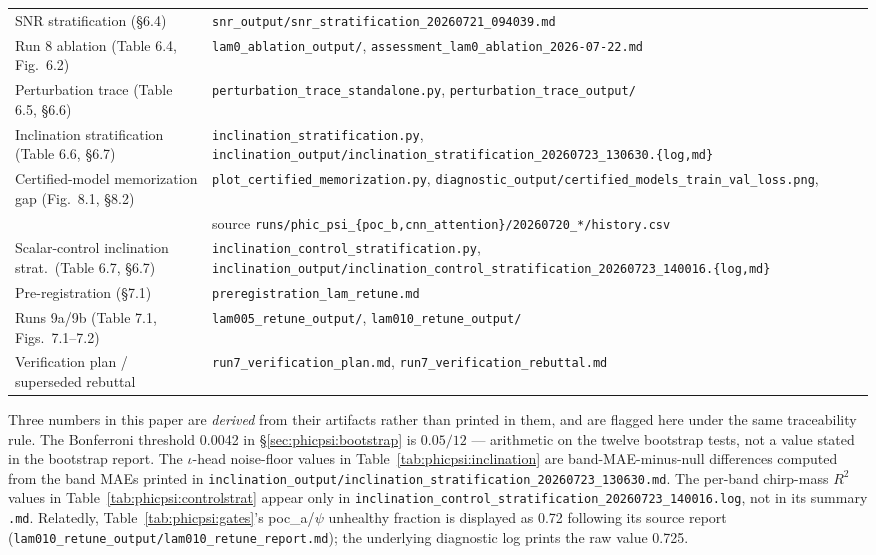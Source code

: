 \begin{table}[tbp]
{\begin{tabular}{@{}ll@{}}
        SNR stratification (\S6.4)                         & \texttt{snr\_output/snr\_stratification\_20260721\_094039.md} \\
        Run 8 ablation (Table 6.4, Fig.~6.2)               & \texttt{lam0\_ablation\_output/}, \texttt{assessment\_lam0\_ablation\_2026-07-22.md} \\
        Perturbation trace (Table 6.5, \S6.6)              & \texttt{perturbation\_trace\_standalone.py}, \texttt{perturbation\_trace\_output/} \\
        Inclination stratification (Table 6.6, \S6.7)      & \texttt{inclination\_stratification.py}, \texttt{inclination\_output/inclination\_stratification\_20260723\_130630.\{log,md\}} \\
        Certified-model memorization gap (Fig.~8.1, \S8.2) & \texttt{plot\_certified\_memorization.py}, \texttt{diagnostic\_output/certified\_models\_train\_val\_loss.png}, \\
                                                           & \quad source \texttt{runs/phic\_psi\_\{poc\_b,cnn\_attention\}/20260720\_*/history.csv} \\
        Scalar-control inclination strat.\ (Table 6.7, \S6.7) & \texttt{inclination\_control\_stratification.py}, \texttt{inclination\_output/inclination\_control\_stratification\_20260723\_140016.\{log,md\}} \\
        Pre-registration (\S7.1)                           & \texttt{preregistration\_lam\_retune.md} \\
        Runs 9a/9b (Table 7.1, Figs.~7.1--7.2)             & \texttt{lam005\_retune\_output/}, \texttt{lam010\_retune\_output/} \\
        Verification plan / superseded rebuttal            & \texttt{run7\_verification\_plan.md}, \texttt{run7\_verification\_rebuttal.md} \\
        \bottomrule
    \end{tabular}
    }
\end{table}

Three numbers in this paper are \emph{derived} from their artifacts rather than printed in them, and are flagged here under the same traceability rule.
The Bonferroni threshold 0.0042 in \S\ref{sec:phicpsi:bootstrap} is $0.05/12$ --- arithmetic on the twelve bootstrap tests, not a value stated in the bootstrap report.
The $\iota$-head noise-floor values in Table~\ref{tab:phicpsi:inclination} are band-MAE-minus-null differences computed from the band MAEs printed in \texttt{inclination\_output/inclination\_stratification\_20260723\_130630.md}.
The per-band chirp-mass $R^2$ values in Table~\ref{tab:phicpsi:controlstrat} appear only in \texttt{inclination\_control\_stratification\_20260723\_140016.log}, not in its summary \texttt{.md}.
Relatedly, Table~\ref{tab:phicpsi:gates}'s poc\_a/$\psi$ unhealthy fraction is displayed as 0.72 following its source report (\texttt{lam010\_retune\_output/lam010\_retune\_report.md}); the underlying diagnostic log prints the raw value 0.725.


